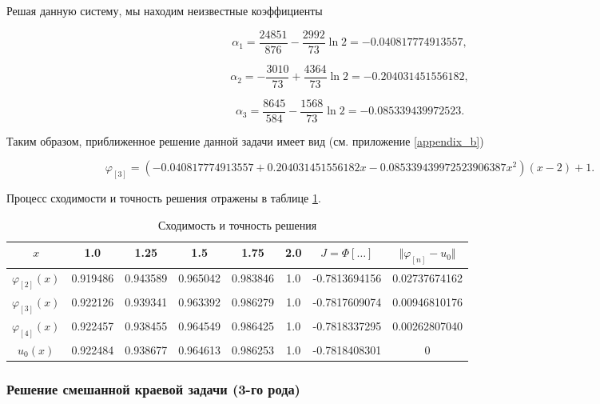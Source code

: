 \noindent Решая данную систему, мы находим неизвестные коэффициенты

\begin{displaymath}
	\alpha_{1} = \frac{24851}{876} - \frac{2992}{73} \ln{2} = -0.040817774913557,
\end{displaymath}

\begin{displaymath}	
	\alpha_{2} = -\frac{3010}{73} + \frac{4364}{73} \ln{2} = -0.204031451556182, 
\end{displaymath}

\begin{displaymath}
	\alpha_{3} = \frac{8645}{584} - \frac{1568}{73} \ln{2} = -0.085339439972523.
\end{displaymath}

Таким образом, приближенное решение данной задачи имеет вид (см. приложение \ref{appendix_b})

\begin{displaymath}	
	\varphi_{[3]} = (-0.040817774913557+0.204031451556182x -0.085339439972523906387x^2)(x-2) + 1.
\end{displaymath}

\noindent Процесс сходимости и точность решения отражены в таблице \ref{table_process_of_convergence_rank_2}.

\begin{table}[!h]
\centering
\begin{tabular}{|c|c|c|c|c|c|c|c|}
	\hline
	$x$ & 1.0 & 1.25 & 1.5 & 1.75 & 2.0 & $J = \Phi[\ldots]$ & $\Vert \varphi_{[n]} - u_{0} \Vert$ \\
	\hline \hline

	$\varphi_{[2]}(x)$ & 0.919486 & 0.943589 & 0.965042 & 0.983846 & 1.0 & -0.7813694156 & 0.02737674162 \\	\hline
	$\varphi_{[3]}(x)$ & 0.922126 & 0.939341 & 0.963392 & 0.986279 & 1.0 & -0.7817609074 & 0.00946810176 \\	\hline
	$\varphi_{[4]}(x)$ & 
0.922457 & 0.938455 & 0.964549 & 0.986425 & 1.0 & -0.7818337295 & 0.00262807040 \\	\hline
	$u_{0}(x)$ & 0.922484 & 0.938677 & 0.964613 & 0.986253 & 1.0 & -0.7818408301 & 0 \\	\hline

\end{tabular}
\caption{Сходимость и точность решения}
\label{table_process_of_convergence_rank_2}
\end{table}

\subsubsection{Решение смешанной краевой задачи (3-го рода)}

